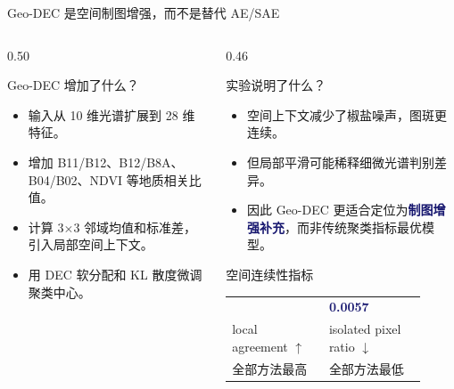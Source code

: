 \documentclass[10pt,aspectratio=169]{beamer}
\newcommand{\metric}[1]{\textcolor{MidnightBlue}{\textbf{#1}}}
\newcommand{\claim}[1]{\textcolor{MidnightBlue}{\textbf{#1}}}
\begin{document}
\begin{frame}{Geo-DEC 是空间制图增强，而不是替代 AE/SAE}
  \begin{columns}[T,onlytextwidth]
    \begin{column}{0.50\linewidth}
      \begin{block}{Geo-DEC 增加了什么？}
        \small
        \begin{itemize}
          \item 输入从 10 维光谱扩展到 28 维特征。
          \item 增加 B11/B12、B12/B8A、B04/B02、NDVI 等地质相关比值。
          \item 计算 3$\times$3 邻域均值和标准差，引入局部空间上下文。
          \item 用 DEC 软分配和 KL 散度微调聚类中心。
        \end{itemize}
      \end{block}
    \end{column}
    \begin{column}{0.46\linewidth}
      \begin{block}{实验说明了什么？}
        \small
        \begin{itemize}
          \item 空间上下文减少了椒盐噪声，图斑更连续。
          \item 但局部平滑可能稀释细微光谱判别差异。
          \item 因此 Geo-DEC 更适合定位为\claim{制图增强补充}，而非传统聚类指标最优模型。
        \end{itemize}
      \end{block}
      \vspace{0.35em}
      \begin{block}{空间连续性指标}
        \centering
        \begin{tabular}{>{\centering\arraybackslash}p{0.42\linewidth}
                        >{\centering\arraybackslash}p{0.42\linewidth}}
          {\Large \metric{0.9348}} & {\Large \metric{0.0057}} \\
          \scriptsize local agreement $\uparrow$ & \scriptsize isolated pixel ratio $\downarrow$ \\
          \scriptsize 全部方法最高 & \scriptsize 全部方法最低 \\
        \end{tabular}
      \end{block}
    \end{column}
  \end{columns}
\end{frame}
\end{document}
